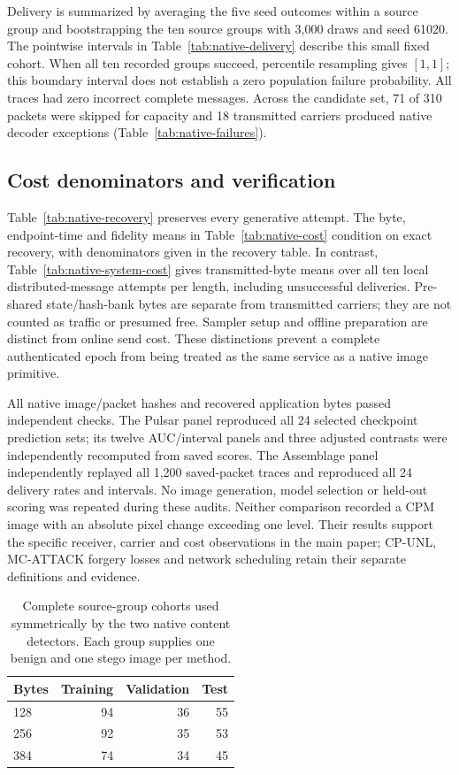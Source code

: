 \documentclass[journal]{IEEEtran}
\renewcommand{\arraystretch}{1.2}
\renewcommand{\arraystretch}{1.0}
\theoremstyle{definition}
\theoremstyle{game}
\renewcommand{\arraystretch}{1.5}
\begin{document}
Delivery is summarized by averaging the five seed outcomes within a
source group and bootstrapping the ten source groups with 3,000 draws
and seed 61020. The pointwise intervals in
Table~\ref{tab:native-delivery} describe this small fixed cohort.
When all ten recorded groups succeed, percentile resampling gives
$[1,1]$; this boundary interval does not establish a zero population
failure probability. All traces had zero incorrect complete messages.
Across the candidate set, 71 of 310 packets were skipped for capacity
and 18 transmitted carriers produced native decoder exceptions
(Table~\ref{tab:native-failures}).

\subsection{Cost denominators and verification}
\label{subsec:native-cost-interpretation}
Table~\ref{tab:native-recovery} preserves every generative attempt.
The byte, endpoint-time and fidelity means in
Table~\ref{tab:native-cost} condition on exact recovery, with
denominators given in the recovery table. In contrast,
Table~\ref{tab:native-system-cost} gives transmitted-byte means over
all ten local distributed-message attempts per length, including
unsuccessful deliveries. Pre-shared state/hash-bank bytes are separate
from transmitted carriers; they are not counted as traffic or presumed
free. Sampler setup and offline preparation are distinct from online
send cost. These distinctions prevent a complete authenticated epoch
from being treated as the same service as a native image primitive.

All native image/packet hashes and recovered application bytes passed
independent checks. The Pulsar panel reproduced all 24 selected
checkpoint prediction sets; its twelve AUC/interval panels and three
adjusted contrasts were independently recomputed from saved scores.
The Assemblage panel independently replayed all 1,200 saved-packet
traces and reproduced all 24 delivery rates and intervals. No image
generation, model selection or held-out scoring was repeated during
these audits. Neither comparison recorded a CPM image with an absolute
pixel change exceeding one level. Their results support the specific
receiver, carrier and cost observations in the main paper; CP-UNL,
MC-ATTACK forgery losses and network scheduling retain their separate
definitions and evidence.

\begin{table}[!t]
\centering\small
\caption{Complete source-group cohorts used symmetrically by the two native content detectors. Each group supplies one benign and one stego image per method.}
\label{tab:native-cohorts}
\setlength{\tabcolsep}{4pt}\renewcommand{\arraystretch}{1.12}
\begin{tabular}{lrrr}
\toprule
Bytes & Training & Validation & Test\\
\midrule
128 & 94 & 36 & 55\\
256 & 92 & 35 & 53\\
384 & 74 & 34 & 45\\
\bottomrule
\end{tabular}

\end{table}
\end{document}
